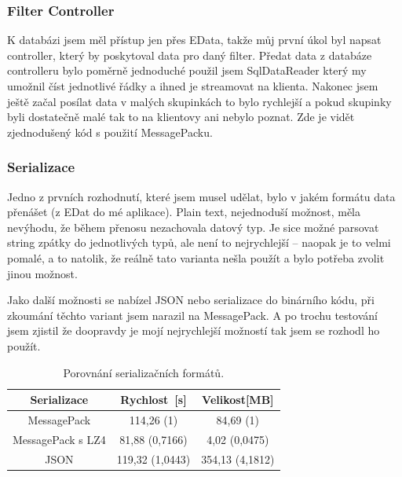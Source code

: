 \documentclass[czech,bachelor,dept460,male,csharp]{diploma}
\newcommand{\EData}{EData}
\begin{document}
		\subsubsection{Filter Controller}
			K databázi jsem měl přístup jen přes {\EData}, takže můj první úkol byl napsat controller, který by poskytoval data pro daný filter. Předat data z databáze controlleru bylo poměrně jednoduché použil jsem SqlDataReader který my umožnil číst jednotlivé řádky a ihned je streamovat na klienta. Nakonec jsem ještě začal posílat data v malých skupinkách to bylo rychlejší a pokud skupinky byli dostatečně malé tak to na klientovy ani nebylo poznat.
			Zde je vidět zjednodušený kód s použití MessagePacku.
			
		\subsubsection{Serializace}
			Jedno z prvních rozhodnutí, které jsem musel udělat, bylo v jakém formátu data přenášet (z EDat do mé aplikace). Plain text, nejednoduší možnost, měla nevýhodu, že během přenosu nezachovala datový typ. Je sice možné parsovat string zpátky do jednotlivých typů, ale není to nejrychlejší -- naopak je to velmi pomalé, a to natolik, že reálně tato varianta nešla použít a bylo potřeba zvolit jinou možnost.
			
			Jako další možnosti se nabízel JSON nebo serializace do binárního kódu, při zkoumání těchto variant jsem narazil na MessagePack. A po trochu testování jsem zjistil že doopravdy je mojí nejrychlejší možností tak jsem se rozhodl ho použít.
			\begin{table}[h!]
				\centering
				\begin{tabular}{|c|c|c|} 
 					\hline
 					Serializace & Rychlost\footnotemark\ [s] & Velikost[MB] \\\hline\hline
 					MessagePack & 114,26 (1)\footnotemark & 84,69 (1)\footnotemark[\value{footnote}] 	\\\hline
 					MessagePack s LZ4 & 81,88 (0,7166)\footnotemark[\value{footnote}] & 4,02 (0,0475)\footnotemark[\value{footnote}]   \\\hline
 					JSON & 119,32 (1,0443)\footnotemark[\value{footnote}]  & 354,13 (4,1812)\footnotemark[\value{footnote}] 	\\\hline
				\end{tabular}
				
				\caption{Porovnání serializačních formátů.}
				\label{table:serilization}
			\end{table}
\end{document}
